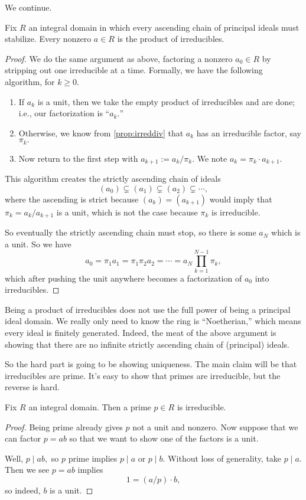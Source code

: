We continue.
\begin{proposition} \label{prop:existfact}
	Fix $R$ an integral domain in which every ascending chain of principal ideals must stabilize. Every nonzero $a\in R$ is the product of irreducibles.
\end{proposition}
\begin{proof}
	We do the same argument as above, factoring a nonzero $a_0\in R$ by stripping out one irreducible at a time. Formally, we have the following algorithm, for $k\ge0.$
	\begin{enumerate}
		\item If $a_k$ is a unit, then we take the empty product of irreducibles and are done; i.e., our factorization is ``$a_k.$''
		\item Otherwise, we know from \autoref{prop:irreddiv} that $a_k$ has an irreducible factor, say $\pi_k.$
		\item Now return to the first step with $a_{k+1}:=a_k/\pi_k.$ We note $a_k=\pi_k\cdot a_{k+1}.$
	\end{enumerate}
	This algorithm creates the strictly ascending chain of ideals
	\[(a_0)\subsetneq(a_1)\subsetneq(a_2)\subsetneq\cdots,\]
	where the ascending is strict because $(a_k)=(a_{k+1})$ would imply that $\pi_k=a_k/a_{k+1}$ is a unit, which is not the case because $\pi_k$ is irreducible.

	So eventually the strictly ascending chain must stop, so there is some $a_N$ which is a unit. So we have
	\[a_0=\pi_1a_1=\pi_1\pi_2a_2=\cdots=a_N\prod_{k=1}^{N-1}\pi_k,\]
	which after pushing the unit anywhere becomes a factorization of $a_0$ into irreducibles.
\end{proof}
\begin{remark}
	Being a product of irreducibles does not use the full power of being a principal ideal domain. We really only need to know the ring is ``Noetherian,'' which means every ideal is finitely generated. Indeed, the meat of the above argument is showing that there are no infinite strictly ascending chain of (principal) ideals.
\end{remark}
So the hard part is going to be showing uniqueness. The main claim will be that irreducibles are prime. It's easy to show that primes are irreducible, but the reverse is hard.
\begin{lemma}
	Fix $R$ an integral domain. Then a prime $p\in R$ is irreducible.
\end{lemma}
\begin{proof}
	Being prime already gives $p$ not a unit and nonzero. Now suppose that we can factor $p=ab$ so that we want to show one of the factors is a unit.

	Well, $p\mid ab,$ so $p$ prime implies $p\mid a$ or $p\mid b.$ Without loss of generality, take $p\mid a.$ Then we see $p=ab$ implies
	\[1=(a/p)\cdot b,\]
	so indeed, $b$ is a unit.
\end{proof}

